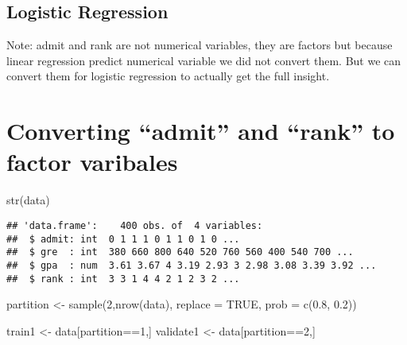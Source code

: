 \documentclass[
]{article}
\newenvironment{Shaded}{\begin{snugshade}}{\end{snugshade}}
\newcommand{\AttributeTok}[1]{\textcolor[rgb]{0.77,0.63,0.00}{#1}}
\newcommand{\ConstantTok}[1]{\textcolor[rgb]{0.00,0.00,0.00}{#1}}
\newcommand{\DecValTok}[1]{\textcolor[rgb]{0.00,0.00,0.81}{#1}}
\newcommand{\FloatTok}[1]{\textcolor[rgb]{0.00,0.00,0.81}{#1}}
\newcommand{\FunctionTok}[1]{\textcolor[rgb]{0.00,0.00,0.00}{#1}}
\newcommand{\NormalTok}[1]{#1}
\newcommand{\OtherTok}[1]{\textcolor[rgb]{0.56,0.35,0.01}{#1}}
\newcommand{\SpecialCharTok}[1]{\textcolor[rgb]{0.00,0.00,0.00}{#1}}
\begin{document}
\hypertarget{logistic-regression}{%
\subsection{Logistic Regression}\label{logistic-regression}}

Note: admit and rank are not numerical variables, they are factors but
because linear regression predict numerical variable we did not convert
them. But we can convert them for logistic regression to actually get
the full insight.

\hypertarget{converting-admit-and-rank-to-factor-varibales}{%
\section{Converting ``admit'' and ``rank'' to factor
varibales}\label{converting-admit-and-rank-to-factor-varibales}}

\begin{Shaded}
\begin{Highlighting}[]
\FunctionTok{str}\NormalTok{(data)}
\end{Highlighting}
\end{Shaded}

\begin{verbatim}
## 'data.frame':    400 obs. of  4 variables:
##  $ admit: int  0 1 1 1 0 1 1 0 1 0 ...
##  $ gre  : int  380 660 800 640 520 760 560 400 540 700 ...
##  $ gpa  : num  3.61 3.67 4 3.19 2.93 3 2.98 3.08 3.39 3.92 ...
##  $ rank : int  3 3 1 4 4 2 1 2 3 2 ...
\end{verbatim}

\begin{Shaded}
\end{Shaded}

\begin{Shaded}
\begin{Highlighting}[]
\NormalTok{partition }\OtherTok{\textless{}{-}} \FunctionTok{sample}\NormalTok{(}\DecValTok{2}\NormalTok{,}\FunctionTok{nrow}\NormalTok{(data), }\AttributeTok{replace =} \ConstantTok{TRUE}\NormalTok{, }\AttributeTok{prob =} \FunctionTok{c}\NormalTok{(}\FloatTok{0.8}\NormalTok{, }\FloatTok{0.2}\NormalTok{))}

\NormalTok{train1 }\OtherTok{\textless{}{-}}\NormalTok{ data[partition}\SpecialCharTok{==}\DecValTok{1}\NormalTok{,]}
\NormalTok{validate1 }\OtherTok{\textless{}{-}}\NormalTok{ data[partition}\SpecialCharTok{==}\DecValTok{2}\NormalTok{,]}
\end{Highlighting}
\end{Shaded}
\end{document}
